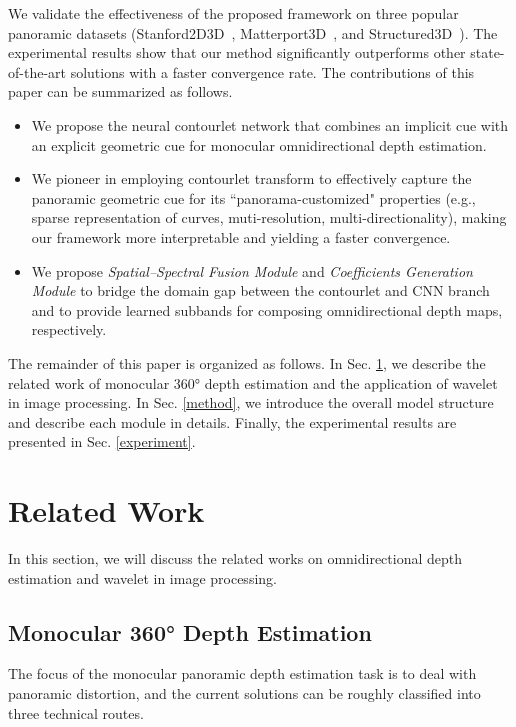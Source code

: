 \documentclass[10pt,times,mathptm,psfig,twocolumn,journals]{IEEEtran}
\begin{document}
We validate the effectiveness of the proposed framework on three popular panoramic datasets (Stanford2D3D~\cite{DBLP:journals/corr/ArmeniSZS17}, Matterport3D~\cite{Chang2018Matterport3D}, and Structured3D~\cite{zheng2020structured3d}). The experimental results show that our method significantly outperforms other state-of-the-art solutions with a faster convergence rate. The contributions of this paper can be summarized as follows.
  
  \begin{itemize}




   \item We propose the neural contourlet network that combines an implicit cue with an explicit geometric cue for monocular omnidirectional depth estimation.
   
   \item We pioneer in employing contourlet transform to effectively capture the panoramic geometric cue for its ``panorama-customized" properties (e.g., sparse representation of curves, muti-resolution, multi-directionality), making our framework more interpretable and yielding a faster convergence. 
    
\item We propose \textit{Spatial–Spectral Fusion Module} and \textit{Coefficients Generation Module} to bridge the domain gap between the contourlet and CNN branch and to provide learned subbands for composing omnidirectional depth maps, respectively.






\end{itemize}
The remainder of this paper is organized as follows. In
Sec. \ref{relatedwork}, we describe the related work of monocular 360° depth estimation and the application of wavelet in image processing. In Sec. \ref{method}, we introduce the overall model structure and describe each module in details. Finally, the experimental results are presented in Sec. \ref{experiment}.
 


\section{Related Work}
\label{relatedwork}
In this section, we will discuss the related works on omnidirectional depth estimation and wavelet in image processing.
\subsection{Monocular 360° Depth Estimation}
The focus of the monocular panoramic depth estimation task is to deal with panoramic distortion, and the current solutions can be roughly classified into three technical routes.
\end{document}
